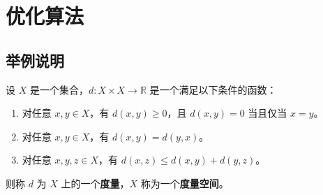 \documentclass[12pt, a4paper, oneside, UTF8]{ctexbook}
\begin{document}
	\else
	\fi
	\chapter{优化算法}
	
	\section{举例说明}
	
	\begin{defn}
		设 $X$ 是一个集合，$d: X \times X \to \mathbb{R}$ 是一个满足以下条件的函数：
		\begin{enumerate}
			\item 对任意 $x, y \in X$，有 $d(x, y) \geq 0$，且 $d(x, y) = 0$ 当且仅当 $x = y$。
			\item 对任意 $x, y \in X$，有 $d(x, y) = d(y, x)$。
			\item 对任意 $x, y, z \in X$，有 $d(x, z) \leq d(x, y) + d(y, z)$。
		\end{enumerate}
		则称 $d$ 为 $X$ 上的一个\textbf{度量}，$X$ 称为一个\textbf{度量空间}。
	\end{defn}
	
	\ifx\allfiles\undefined
\end{document}
